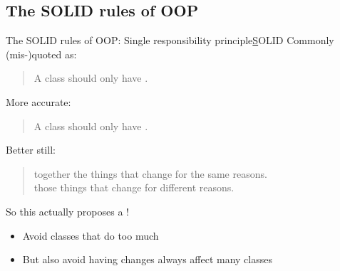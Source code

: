 \subsection{The SOLID rules of OOP}

%	


\begin{frame}{The SOLID rules of OOP: Single responsibility principle}{\underline SOLID}
	Commonly (mis-)quoted as:
	
	\begin{quote}
		A class should only have .
	\end{quote}

	\medskip
	More accurate:
	
	\begin{quote}
		A class should only have .
	\end{quote}

	\medskip
	Better still:
	\begin{quote}
		 together the things that change for the same reasons. \\
		 those things that change for different reasons.
	\end{quote}

	\medskip
	So this actually proposes a !
	\begin{itemize}
		\item Avoid classes that do too much 
		\item But also avoid having changes always affect many classes 
	\end{itemize}
\end{frame}

